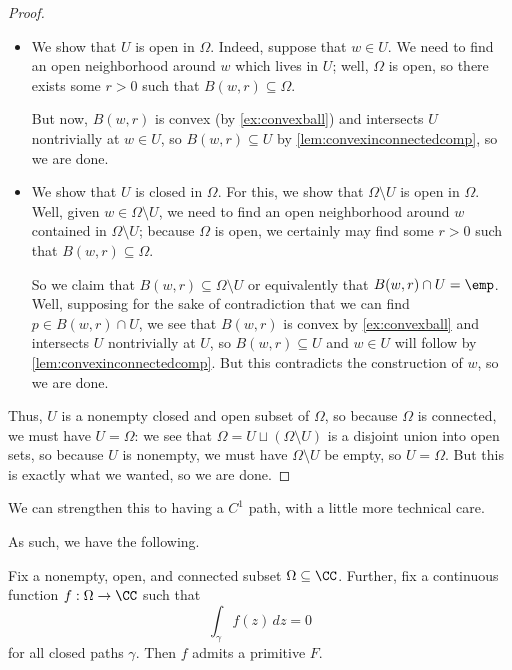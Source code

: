\begin{proof}
\begin{itemize}
		\item We show that $U$ is open in $\Omega$. Indeed, suppose that $w\in U$. We need to find an open neighborhood around $w$ which lives in $U$; well, $\Omega$ is open, so there exists some $r>0$ such that $B(w,r)\subseteq\Omega$.
		
		But now, $B(w,r)$ is convex (by \autoref{ex:convexball}) and intersects $U$ nontrivially at $w\in U$, so $B(w,r)\subseteq U$ by \autoref{lem:convexinconnectedcomp}, so we are done.

		\item We show that $U$ is closed in $\Omega$. For this, we show that $\Omega\setminus U$ is open in $\Omega$. Well, given $w\in\Omega\setminus U$, we need to find an open neighborhood around $w$ contained in $\Omega\setminus U$; because $\Omega$ is open, we certainly may find some $r>0$ such that $B(w,r)\subseteq\Omega$.

		So we claim that $B(w,r)\subseteq\Omega\setminus U$ or equivalently that $B(w,r)\cap U=\emp$. Well, supposing for the sake of contradiction that we can find $p\in B(w,r)\cap U$, we see that $B(w,r)$ is convex by \autoref{ex:convexball} and intersects $U$ nontrivially at $U$, so $B(w,r)\subseteq U$ and $w\in U$ will follow by \autoref{lem:convexinconnectedcomp}. But this contradicts the construction of $w$, so we are done.
	\end{itemize}
	Thus, $U$ is a nonempty closed and open subset of $\Omega$, so because $\Omega$ is connected, we must have $U=\Omega$: we see that $\Omega=U\sqcup(\Omega\setminus U)$ is a disjoint union into open sets, so because $U$ is nonempty, we must have $\Omega\setminus U$ be empty, so $U=\Omega$. But this is exactly what we wanted, so we are done.
\end{proof}
\begin{remark}
	We can strengthen this to having a $C^1$ path, with a little more technical care.
\end{remark}
As such, we have the following.
\begin{theorem} \label{thm:getprimitive}
	Fix a nonempty, open, and connected subset $\Omega\subseteq\CC$. Further, fix a continuous function $f:\Omega\to\CC$ such that
	\[\int_\gamma f(z)\,dz=0\]
	for all closed paths $\gamma$. Then $f$ admits a primitive $F$.
\end{theorem}
